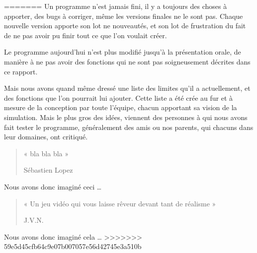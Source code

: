 =======
Un programme n'est jamais fini, il y a toujours des choses à apporter, des bugs à corriger, même les versions finales ne le sont pas. Chaque nouvelle version apporte son lot ne nouveautés, et son lot de frustration du fait de ne pas avoir pu finir tout ce que l'on voulait créer.

Le programme aujourd'hui n'est plus modifié jusqu'à la présentation orale, de manière à ne pas avoir des fonctions qui ne sont pas soigneusement décrites dans ce rapport.

Mais nous avons quand même dressé une liste des limites qu'il a actuellement, et des fonctions que l'on pourrait lui ajouter. Cette liste a été crée au fur et à mesure de la conception par toute l'équipe, chacun apportant sa vision de la simulation. Mais le plus gros des idées, viennent des personnes à qui nous avons fait tester le programme, généralement des amis ou nos parents, qui chacuns dans leur domaines, ont critiqué.

\begin{quotation}
	« bla bla bla »
	\begin{flushright}
		Sébastien Lopez
	\end{flushright}
\end{quotation}

Nous avons donc imaginé ceci …

\begin{quotation}
	« Un jeu vidéo qui vous laisse rêveur devant tant de réalisme »
	\begin{flushright}
		J.V.N.
	\end{flushright}
\end{quotation}


Nous avons donc imaginé cela …
>>>>>>> 59e5d45cfb64c9e07b007057e56d42745e3a510b
